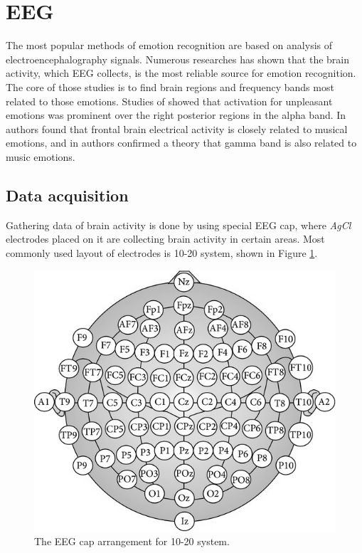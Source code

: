 \documentclass[10pt,journal,compsoc,twoside]{IEEEtran}
\newcommand{\Ref}[2]{#2 \ref{#1}}
\begin{document}
\section{EEG}
The most popular methods of emotion recognition are based on analysis of electroencephalography signals. Numerous researches\cite{LinMusic,GaoMehmood,NieWangShiLu,AdolphsTranesDamasio2003,DamasioGrabowski2000} has shown that the brain activity, which EEG collects, is the most reliable source for emotion recognition. The core of those studies is to find brain regions and frequency bands most related to those emotions. Studies of \cite{SarloBuodoPoliPalomba} showed that activation for unpleasant emotions was prominent over the right posterior regions in the alpha band. In \cite{SchmidtTrainor2001} authors found that frontal brain electrical activity is closely related to musical emotions, and in \cite{LiLu2009} authors confirmed a theory that gamma band is also related to music emotions.

\subsection{Data acquisition} 
Gathering data of brain activity is done by using special EEG cap, where \textit{AgCl} electrodes placed on it are collecting brain activity in certain areas. Most commonly used layout of electrodes is 10-20 system, shown in \Ref{fig:1020electrodes}{Figure}.

\begin{figure}[ht]
	\centering
	\includegraphics[width=0.7\linewidth]{10_20_electrodes}
	\caption{The EEG cap arrangement for 10-20 system.\cite{JirayucharoensakSuwichaPanngumIsrasenaPasin2014}}
	\label{fig:1020electrodes}
\end{figure}
\end{document}
